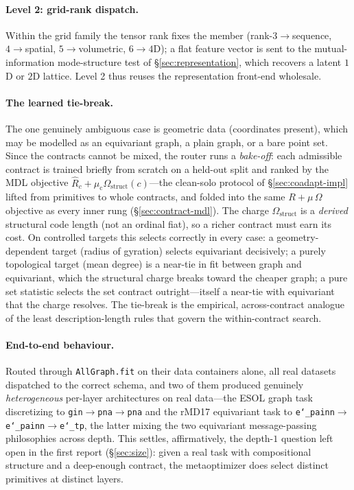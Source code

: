 \documentclass[11pt]{article}
\newcommand{\allowbreakhere}{\discretionary{}{}{}}
\newcommand{\code}[1]{\texttt{\def\_{\char`_\allowbreakhere}#1}}
\begin{document}
\paragraph{Level 2: grid-rank dispatch.} Within the grid family the tensor rank fixes the member
(rank-$3\to$sequence, $4\to$spatial, $5\to$volumetric, $6\to4$D); a flat feature vector is sent to the
mutual-information mode-structure test of \S\ref{sec:representation}, which recovers a latent $1$D or
$2$D lattice. Level 2 thus reuses the representation front-end wholesale.

\paragraph{The learned tie-break.} The one genuinely ambiguous case is geometric data (coordinates
present), which may be modelled as an equivariant graph, a plain graph, or a bare point set. Since the
contracts cannot be mixed, the router runs a \emph{bake-off}: each admissible contract is trained
briefly from scratch on a held-out split and ranked by the MDL objective $\widehat R_c+\mu_{\mathrm c}
\Omega_{\mathrm{struct}}(c)$---the clean-solo protocol of \S\ref{sec:coadapt-impl} lifted from primitives
to whole contracts, and folded into the same $R+\mu\,\Omega$ objective as every inner rung
(\S\ref{sec:contract-mdl}). The charge $\Omega_{\mathrm{struct}}$ is a \emph{derived} structural code
length (not an ordinal fiat), so a richer contract must earn its cost. On controlled targets this
selects correctly in every case: a geometry-dependent target (radius of gyration) selects
equivariant decisively; a purely topological target (mean degree) is a near-tie in fit between graph and
equivariant, which the structural charge breaks toward the cheaper graph; a pure set statistic selects
the set contract outright---itself a near-tie with equivariant that the charge resolves. The tie-break is
the empirical, across-contract analogue of the least
description-length rules that govern the within-contract search.

\paragraph{End-to-end behaviour.} Routed through \code{AllGraph.fit} on their data containers alone,
all real datasets dispatched to the correct schema, and two of them produced genuinely
\emph{heterogeneous} per-layer architectures on real data---the ESOL graph task discretizing to
\code{gin}$\to$\code{pna}$\to$\code{pna} and the rMD17 equivariant task to
\code{e\_painn}$\to$\code{e\_painn}$\to$\code{e\_tp}, the latter mixing the two equivariant
message-passing philosophies across depth. This settles, affirmatively, the depth-$1$ question left
open in the first report (\S\ref{sec:size}): given a real task with compositional structure and a
deep-enough contract, the metaoptimizer does select distinct primitives at distinct layers.
\end{document}
